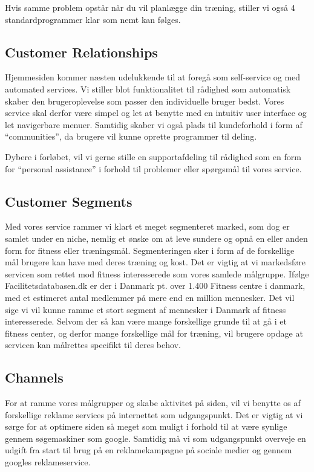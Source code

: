\documentclass[a4paper,]{article}
\begin{document}
Hvis samme problem opstår når du vil planlægge din træning, stiller vi også 4 standardprogrammer klar som nemt kan følges. 

\subsection{Customer Relationships}
Hjemmesiden kommer næsten udelukkende til at foregå som self-service og med automated services. Vi stiller blot funktionalitet til rådighed som automatisk skaber den brugeroplevelse som passer den individuelle bruger bedst. Vores service skal derfor være simpel og let at benytte med en intuitiv user interface og let navigerbare menuer. Samtidig skaber vi også plads til kundeforhold i form af “communities”, da brugere vil kunne oprette programmer til deling. 

Dybere i forløbet, vil vi gerne stille en supportafdeling til rådighed som en form for “personal assistance” i forhold til problemer eller spørgsmål til vores service. 

\subsection{Customer Segments}
Med vores service rammer vi klart et meget segmenteret marked, som dog er samlet under en niche, nemlig et ønske om at leve sundere og opnå en eller anden form for fitness eller træningsmål. Segmenteringen sker i form af de forskellige mål brugere kan have med deres træning og kost. Det er vigtig at vi markedsføre servicen som rettet mod fitness interesserede som vores samlede målgruppe.  Ifølge Facilitetsdatabasen.dk er der i Danmark pt. over 1.400 Fitness centre i danmark, med et estimeret antal medlemmer på mere end en million mennesker. Det vil sige vi vil kunne ramme et stort segment af mennesker i Danmark af fitness interesserede. Selvom der så kan være mange forskellige grunde til at gå i et fitness center, og derfor mange forskellige mål for træning, vil brugere opdage at servicen kan målrettes specifikt til deres behov.

\subsection{Channels}
For at ramme vores målgrupper og skabe aktivitet på siden, vil vi benytte os af forskellige reklame services på internettet som udgangspunkt. Det er vigtig at vi sørge for at optimere siden så meget som muligt i forhold til at være synlige gennem søgemaskiner som google. Samtidig må vi som udgangspunkt overveje en udgift fra start til brug på en reklamekampagne på sociale medier og gennem googles reklameservice.
\end{document}
